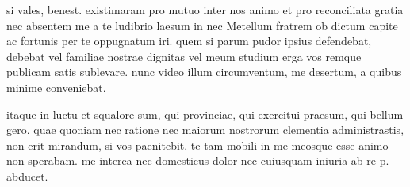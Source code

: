 


 si vales, benest. existimaram pro mutuo inter nos animo et pro reconciliata gratia nec absentem me a te ludibrio laesum in nec Metellum fratrem ob dictum capite ac fortunis per te oppugnatum iri. quem si parum pudor ipsius defendebat, debebat vel familiae nostrae dignitas vel meum studium erga vos remque publicam satis sublevare. nunc video illum circumventum, me desertum, a quibus minime conveniebat.

 itaque in luctu et squalore sum, qui provinciae, qui exercitui praesum, qui bellum gero. quae quoniam nec ratione nec maiorum nostrorum clementia administrastis, non erit mirandum, si vos paenitebit. te tam mobili in me meosque esse animo non sperabam. me interea nec domesticus dolor nec cuiusquam iniuria ab re p. abducet.
